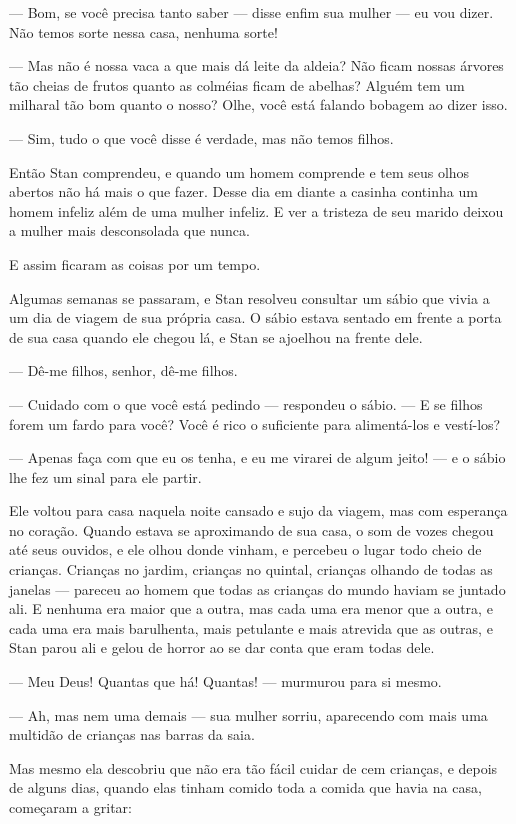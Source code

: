 — Bom, se você precisa tanto saber — disse enfim sua mulher — eu vou
dizer. Não temos sorte nessa casa, nenhuma sorte!

— Mas não é nossa vaca a que mais dá leite da aldeia? Não ficam nossas
árvores tão cheias de frutos quanto as colméias ficam de abelhas?
Alguém tem um milharal tão bom quanto o nosso? Olhe, você está
falando bobagem ao dizer isso.

— Sim, tudo o que você disse é verdade, mas não temos filhos.

Então Stan comprendeu, e quando um homem comprende e tem seus olhos
abertos não há mais o que fazer. Desse dia em diante a casinha
continha um homem infeliz além de uma mulher infeliz. E ver a
tristeza de seu marido deixou a mulher mais desconsolada que nunca.

E assim ficaram as coisas por um tempo.

Algumas semanas se passaram, e Stan resolveu consultar um sábio que
vivia a um dia de viagem de sua própria casa. O sábio estava sentado
em frente a porta de sua casa quando ele chegou lá, e Stan se
ajoelhou na frente dele.

— Dê-me filhos, senhor, dê-me filhos.

— Cuidado com o que você está pedindo — respondeu o sábio. — E se
filhos forem um fardo para você? Você é rico o suficiente para
alimentá-los e vestí-los? 

— Apenas faça com que eu os tenha, e eu me virarei de algum jeito! — e
o sábio lhe fez um sinal para ele partir.

Ele voltou para casa naquela noite cansado e sujo da viagem, mas com
esperança no coração. Quando estava se aproximando de sua casa, o som
de vozes chegou até seus ouvidos, e ele olhou donde vinham, e
percebeu o lugar todo cheio de crianças. Crianças no jardim, crianças
no quintal, crianças olhando de todas as janelas — pareceu ao homem
que todas as crianças do mundo haviam se juntado ali. E nenhuma era
maior que a outra, mas cada uma era menor que a outra, e cada uma era
mais barulhenta, mais petulante e mais atrevida que as outras, e Stan
parou ali e gelou de horror ao se dar conta que eram todas dele.

— Meu Deus! Quantas que há! Quantas! — murmurou para si mesmo.

— Ah, mas nem uma demais — sua mulher sorriu, aparecendo com mais uma
multidão de crianças nas barras da saia.

Mas mesmo ela descobriu que não era tão fácil cuidar de cem crianças,
e depois de alguns dias, quando elas tinham comido toda a comida que
havia na casa, começaram a gritar:


